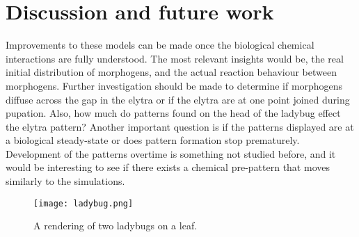\section{Discussion and future work}
Improvements to these models can be made once the biological chemical interactions are fully understood. The most relevant insights would be, the real initial distribution of morphogens, and the actual reaction behaviour between morphogens. Further investigation should be made to determine if morphogens diffuse across the gap in the elytra or if the elytra are at one point joined during pupation. Also, how much do patterns found on the head of the ladybug effect the elytra pattern? Another important question is if the patterns displayed are at a biological steady-state or does pattern formation stop prematurely. Development of the patterns overtime is something not studied before, and it would be interesting to see if there exists a chemical pre-pattern that moves similarly to the simulations.


\begin{figure}[p]
	\centering
	\texttt{[image: ladybug.png]}
	\caption{A rendering of two ladybugs on a leaf.}
	\label{fig:ladybugRender}
\end{figure}
